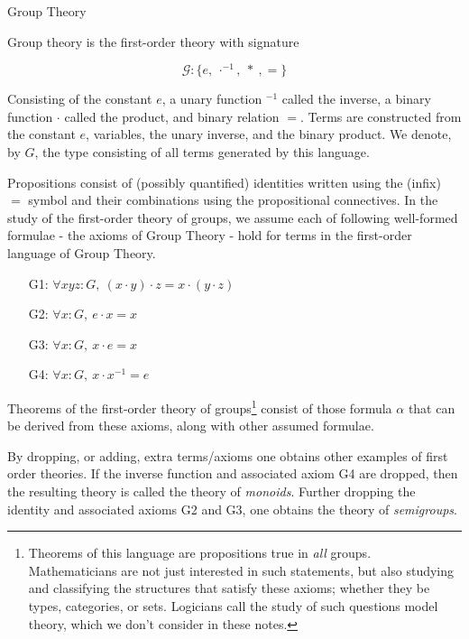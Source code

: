 \documentclass{book}
\begin{document}
    \begin{eg}{Group Theory}

        Group theory is the first-order theory with signature

        $$ \mathcal{G} : \{e, \ \cdot^{-1}, \ * \ , =\} $$

        Consisting of the constant $e$, a unary function $^{-1}$ called the inverse, a binary function $\cdot$ called the product, and binary relation $=$. Terms are constructed from the constant $e$, variables, the unary inverse, and the binary product. We denote, by $G$, the type consisting of all terms generated by this language.        
        
        Propositions consist of (possibly quantified) identities written using the (infix) $=$ symbol and their combinations using the propositional connectives.  In the study of the first-order theory of groups, we assume each of following well-formed formulae - the axioms of Group Theory - hold for terms in the first-order language of Group Theory.

        \begin{itemize}
            \item[G1:] $\forall x y z : G, \ (x \cdot y) \cdot z = x \cdot (y \cdot z)$
            \item[G2:] $\forall x : G, \ e \cdot x = x$
            \item[G3:] $\forall x : G, \ x \cdot e = x$    
            \item[G4:] $\forall x : G, \ x \cdot x^{-1} = e$                        
        \end{itemize}

        Theorems of the first-order theory of groups\footnote{Theorems of this language are propositions true in \emph{all} groups. Mathematicians are not just interested in such statements, but also studying and classifying the structures that satisfy these axioms; whether they be types, categories, or sets. Logicians call the study of such questions model theory, which we don't consider in these notes.} consist of those formula $\alpha$ that can be derived from these axioms, along with other assumed formulae.
    \end{eg}

    By dropping, or adding, extra terms/axioms one obtains other examples of first order theories. If the inverse function and associated axiom G4 are dropped, then the resulting theory is called the theory of \emph{monoids}. Further dropping the identity and associated axioms G2 and G3, one obtains the theory of \emph{semigroups}.
\end{document}
